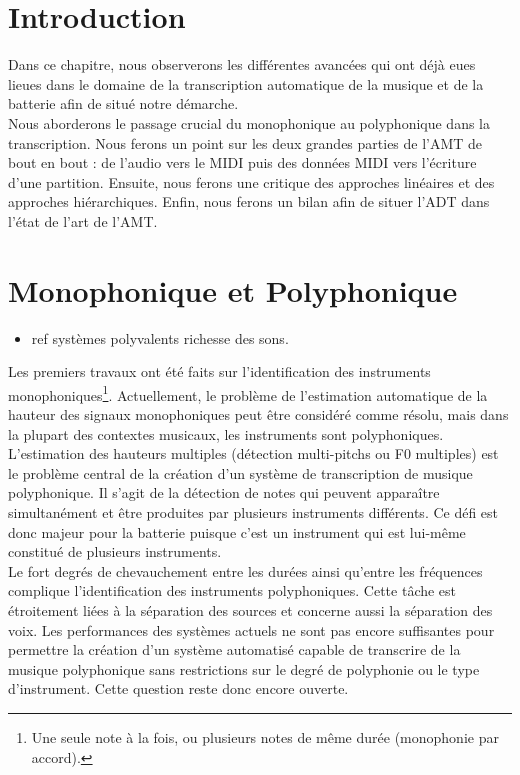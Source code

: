 \section*{Introduction}
Dans ce chapitre, nous observerons les différentes avancées qui ont déjà eues lieues dans le domaine de la transcription automatique de la musique et de la batterie afin de situé notre démarche.\\
Nous aborderons le passage crucial du monophonique au polyphonique dans la transcription. Nous ferons un point sur les deux grandes parties de l’AMT de bout en bout : de l’audio vers le MIDI puis des données MIDI vers l’écriture d’une partition. Ensuite, nous ferons une critique des approches linéaires et des approches hiérarchiques. Enfin, nous ferons un bilan afin de situer l’ADT dans l’état de l’art de l’AMT.
  
\section{Monophonique et Polyphonique}
\begin{itemize}
	\item ref systèmes polyvalents richesse des sons.\\
\end{itemize}
Les premiers travaux ont été faits sur l’identification des instruments monophoniques\footnote{Une seule note à la fois, ou plusieurs notes de même durée (monophonie par accord).}\cite{future_directions}. Actuellement, le problème de l'estimation automatique de la hauteur des signaux monophoniques peut être considéré comme résolu, mais dans la plupart des contextes musicaux, les instruments sont polyphoniques.\\
L'estimation des hauteurs multiples (détection multi-pitchs ou F0 multiples) est le problème central de la création d'un système de transcription de musique polyphonique. Il s’agit de la détection de notes qui peuvent apparaître simultanément et être produites par plusieurs instruments différents. Ce défi est donc majeur pour la batterie puisque c’est un instrument qui est lui-même constitué de plusieurs instruments.\\
Le fort degrés de chevauchement entre les durées ainsi qu’entre les fréquences complique l’identification des instruments polyphoniques. Cette tâche est étroitement liées à la séparation des sources et concerne aussi la séparation des voix. Les performances des systèmes actuels ne sont pas encore suffisantes pour permettre la création d'un système automatisé capable de transcrire de la musique polyphonique sans restrictions sur le degré de polyphonie ou le type d'instrument. Cette question reste donc encore ouverte. 
